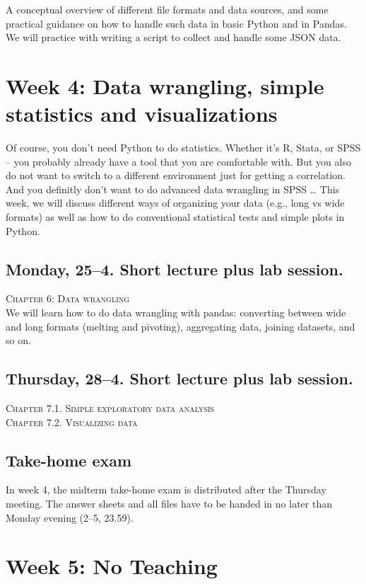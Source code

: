 A conceptual overview of different file formats and data sources, and some practical guidance on how to handle such data in basic Python and in Pandas. We will practice with writing a script to collect and handle some JSON data.


\section*{Week 4: Data wrangling, simple statistics and visualizations}
Of course, you don't need Python to do statistics. Whether it's R, Stata, or SPSS -- you probably already have a tool that you are comfortable with. But you also do not want to switch to a different environment just for getting a correlation. And you definitly don't want to do advanced data wrangling in SPSS \ldots
This week, we will discuss different ways of organizing your data (e.g., long vs wide formats) as well as how to do conventional statistical tests and simple plots in Python.

\subsection*{Monday, 25--4. Short lecture plus lab session.}
\textsc{ Chapter 6: Data wrangling}\\
We will learn how to do data wrangling with pandas: converting between wide and long formats (melting and pivoting), aggregating data, joining datasets, and so on.

\subsection*{Thursday, 28--4.  Short lecture plus lab session.}
\textsc{ Chapter 7.1. Simple exploratory data analysis}\\
\textsc{ Chapter 7.2. Visualizing data}\\

\subsection*{Take-home exam}
In week 4, the midterm take-home exam is distributed after the Thursday meeting. The answer sheets and all files have to be handed in no later than Monday evening (2--5, 23.59).

\section*{Week 5: No Teaching}
